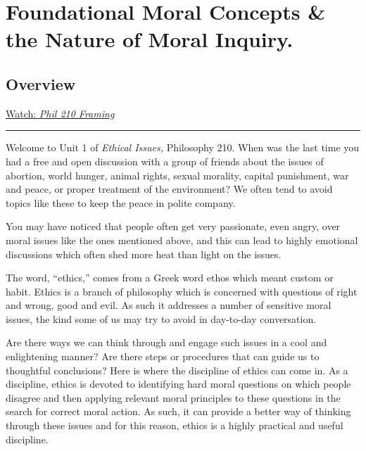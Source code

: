 \documentclass[
]{book}
\begin{document}
\hypertarget{foundational-moral-concepts-the-nature-of-moral-inquiry.}{%
\chapter{Foundational Moral Concepts \& the Nature of Moral Inquiry.}\label{foundational-moral-concepts-the-nature-of-moral-inquiry.}}

\hypertarget{overview}{%
\section*{Overview}\label{overview}}

\href{https://vimeo.com/861713419/4d5e72685d}{Watch: \emph{Phil 210 Framing}}

\begin{center}\rule{0.5\linewidth}{0.5pt}\end{center}

Welcome to Unit 1 of \emph{Ethical Issues,} Philosophy 210. When was the last time you had a free and open discussion with a group of friends about the issues of abortion, world hunger, animal rights, sexual morality, capital punishment, war and peace, or proper treatment of the environment? We often tend to avoid topics like these to keep the peace in polite company.

You may have noticed that people often get very passionate, even angry, over moral issues like the ones mentioned above, and this can lead to highly emotional discussions which often shed more heat than light on the issues.

The word, ``ethics,'' comes from a Greek word ethos which meant custom or habit. Ethics is a branch of philosophy which is concerned with questions of right and wrong, good and evil. As such it addresses a number of sensitive moral issues, the kind some of us may try to avoid in day-to-day conversation.

Are there ways we can think through and engage such issues in a cool and enlightening manner? Are there steps or procedures that can guide us to thoughtful conclusions? Here is where the discipline of ethics can come in. As a discipline, ethics is devoted to identifying hard moral questions on which people disagree and then applying relevant moral principles to these questions in the search for correct moral action. As such, it can provide a better way of thinking through these issues and for this reason, ethics is a highly practical and useful discipline.
\end{document}
